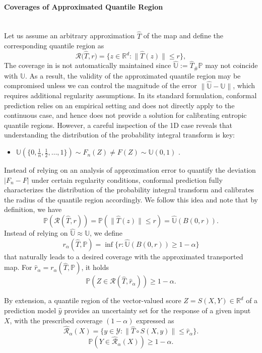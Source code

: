 \paragraph{Coverages of Approximated Quantile Region} \quad \\
Let us assume an arbitrary approximation $\hat T$ of the \citet{Bre91} map and define the corresponding quantile region as
$$
\mathcal{R}\big(\hat T, r\big) = \{z \in \mathbb{R}^d: \|\hat T(z)\| \leq r\},
$$
The coverage in  is not automatically maintained since $ \hat{\mathbb{U}} := \hat{T}_\# \mathbb{P} $ may not coincide with $ \mathbb{U} $. As a result, the validity of the approximated quantile region may be compromised unless we can control the magnitude of the error $ \|\hat{\mathbb{U}} - \mathbb{U}\| $, which requires additional regularity assumptions.  
In its standard formulation, conformal prediction relies on an empirical setting and does not directly apply to the continuous case, and hence does not provide a solution for calibrating entropic quantile regions. However, a careful inspection of the 1D case reveals that understanding the distribution of the probability integral transform is key:
\begin{itemize}
    \item $\mathbb{U}\left(\big\{0, \frac1n, \frac12, \ldots, 1\big\}\right) \sim F_n(Z) \neq F(Z) \sim \mathbb{U}(0, 1)$ .
\end{itemize}
Instead of relying on an analysis of approximation error to quantify the deviation $|F_n - F|$ under certain regularity conditions, conformal prediction fully characterizes the distribution of the probability integral transform and calibrates the radius of the quantile region accordingly.
We follow this idea and note that by definition, we have
$$
\mathbb{P}(\mathcal{R}(\hat T, r)) = \mathbb{P}(\|\hat T(z)\| \leq r) = \hat{ \mathbb{U}} (B(0, r)).
$$
Instead of relying on $\hat{ \mathbb{U}} \approx \mathbb{U}$, we define
\begin{equation}\label{eq:generic_radius}
r_\alpha(\hat T, \mathbb{P}) = \inf\{r: \hat{ \mathbb{U}} (B(0, r)) \geq 1-\alpha\}
\end{equation}
that naturally leads to a desired coverage with the approximated transported map. For $\hat{r}_\alpha = r_\alpha(\hat T, \mathbb{P})$, it holds
$$\mathbb{P}\left(Z \in \mathcal{R}(\hat T, \hat{r}_\alpha)\right) \geq 1-\alpha.$$

By extension, a quantile region of the vector-valued score $Z = S(X, Y) \in \mathbb{R}^d$ of a prediction model $\hat y$ provides an uncertainty set for the response of a given input $X$, with the prescribed coverage $(1-\alpha)$ expressed as
\begin{equation*}
\widehat{\mathcal{R}}_{\alpha}(X) = \big\{y \in \mathcal{Y}: \|\hat T \circ S(X, y)\| \leq \hat{r}_\alpha\big\}.
\end{equation*}
\begin{equation}\label{eq:transport_oracle_coverage} 
\mathbb{P}(Y \in \widehat{\mathcal{R}}_{\alpha}(X)) \geq 1 - \alpha.
\end{equation}

